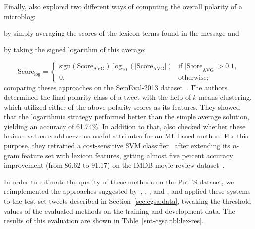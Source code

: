 Finally, \citet{Kolchyna:15} also explored two different ways of
computing the overall polarity of a microblog:
\begin{inparaenum}[(i)]
\item by simply averaging the scores of the lexicon terms found in the
  message and
\item by taking the signed logarithm of this average:
\end{inparaenum}
\begin{equation*}
  \text{Score}_{\log} =
  \begin{cases}
    \text{sign}(\text{Score}_{\text{AVG}})\log_{10}(|\text{Score}_{\text{AVG}}|) & %
    \text{if |Score}_{\text{AVG}}| > 0.1,\\
    0, & \text{otherwise};
  \end{cases}
\end{equation*}%
comparing theses approaches on the SemEval-2013
dataset~\cite{Nakov:13}.  The authors determined the final polarity
class of a tweet with the help of $k$-means clustering, which utilized
either of the above polarity scores as its features.  They showed that
the logarithmic strategy performed better than the simple average
solution, yielding an accuracy of 61.74\%.  In addition to that,
\citeauthor{Kolchyna:15} also checked whether these lexicon values
could serve as useful attributes for an ML-based method.  For this
purpose, they retrained a cost-sensitive SVM
classifier~\cite{Masnadi:12} after extending its $n$-gram feature set
with lexicon features, getting almost five percent accuracy
improvement (from 86.62 to 91.17) on the IMDB movie review
dataset~\cite{Pang:02}.


In order to estimate the quality of these methods on the PotTS
dataset, we reimplemented the approaches suggested
by~\citet{Taboada:11}, \citet{Musto:14}, \citet{Jurek:15}, and
\citet{Kolchyna:15}, and applied these systems to the test set tweets
described in Section~\ref{sec:cgsa:data}, tweaking the threshold
values of the evaluated methods on the training and development data.
The results of this evaluation are shown in Table~\ref{snt-cgsa:tbl:lex-res}.

